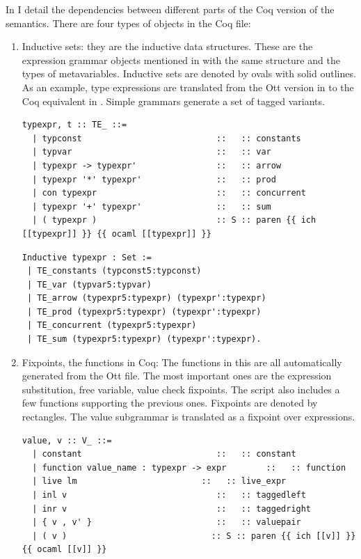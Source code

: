 \documentclass[12pt,twoside,notitlepage]{report}
\begin{document}
In  I detail the dependencies between different parts of the Coq version of the semantics. There are four types of objects in the Coq file:
\begin{enumerate}
\item{Inductive sets: they are the inductive data structures. These are the expression grammar objects mentioned in  with the same structure and the types of metavariables. Inductive sets are denoted by ovals with solid outlines. As an example, type expressions are translated from the Ott version in  to the Coq equivalent in . Simple grammars generate a set of tagged variants. 



\begin{lstlisting}[language={Ott}, caption={Ott type expressions}, label={lst:otttypexpr}]
typexpr, t :: TE_ ::=
  | typconst                           ::   :: constants
  | typvar                             ::   :: var
  | typexpr -> typexpr'                ::   :: arrow
  | typexpr '*' typexpr'               ::   :: prod
  | con typexpr                        ::   :: concurrent
  | typexpr '+' typexpr'               ::   :: sum
  | ( typexpr )                        :: S :: paren {{ ich [[typexpr]] }} {{ ocaml [[typexpr]] }}
\end{lstlisting}


\begin{minipage}{\linewidth}

\begin{lstlisting}[language={Coq},caption={Coq type expr}, label={lst:coqtypexpr}]
Inductive typexpr : Set := 
 | TE_constants (typconst5:typconst)
 | TE_var (typvar5:typvar)
 | TE_arrow (typexpr5:typexpr) (typexpr':typexpr)
 | TE_prod (typexpr5:typexpr) (typexpr':typexpr)
 | TE_concurrent (typexpr5:typexpr)
 | TE_sum (typexpr5:typexpr) (typexpr':typexpr).
\end{lstlisting}

\end{minipage}
}
\item{Fixpoints, the functions in Coq: The functions in this are all automatically generated from the Ott file. The most important ones are the expression substitution, free variable, value check fixpoints. The script also includes a few functions supporting the previous ones. Fixpoints are denoted by rectangles. The value subgrammar is translated as a fixpoint over expressions. 


\begin{lstlisting}[language={Ott}, caption={Ott value subgrammar}, label={lst:ottvaluesub}]
value, v :: V_ ::=
  | constant                           ::   :: constant
  | function value_name : typexpr -> expr        ::   :: function
  | live lm                         ::   :: live_expr
  | inl v                              ::   :: taggedleft
  | inr v                              ::   :: taggedright
  | { v , v' }                         ::   :: valuepair
  | ( v )                             :: S :: paren {{ ich [[v]] }} {{ ocaml [[v]] }}
\end{lstlisting}


}
\end{enumerate}
\end{document}
